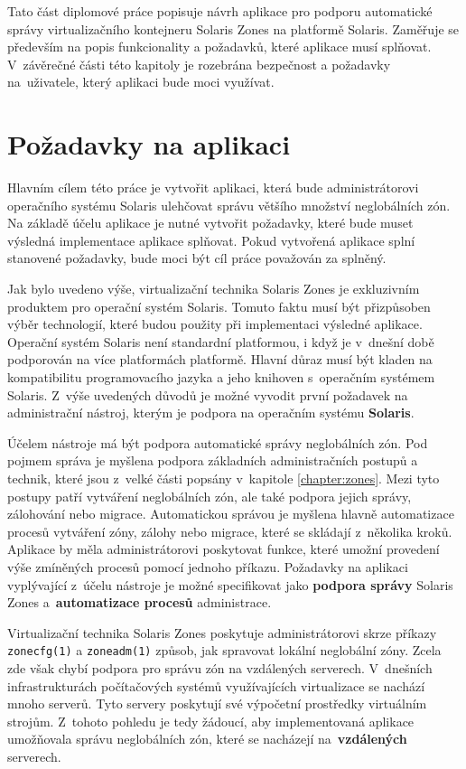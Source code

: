 Tato část diplomové práce popisuje návrh aplikace pro podporu automatické správy virtualizačního kontejneru Solaris Zones na
platformě Solaris. Zaměřuje se především na popis funkcionality a požadavků, které aplikace musí splňovat. V~závěrečné části
této kapitoly je rozebrána bezpečnost a požadavky na~uživatele, který aplikaci bude moci využívat.
\section{Požadavky na aplikaci}
\label{chapter:design:demands}
Hlavním cílem této práce je vytvořit aplikaci, která bude administrátorovi operačního systému Solaris ulehčovat správu
většího množství neglobálních zón. Na základě účelu aplikace je nutné vytvořit požadavky, které bude muset výsledná implementace
aplikace splňovat. Pokud vytvořená aplikace splní stanovené požadavky, bude moci být cíl práce považován za splněný.

Jak bylo uvedeno výše, virtualizační technika Solaris Zones je exkluzivním produktem pro operační
systém Solaris. Tomuto faktu musí být přizpůsoben výběr technologií, které budou použity při implementaci výsledné aplikace.
Operační systém Solaris není standardní platformou, i když je v~dnešní době podporován na více platformách platformě. Hlavní důraz
musí být kladen na kompatibilitu programovacího jazyka a jeho knihoven s~operačním systémem Solaris. Z~výše uvedených důvodů
je možné vyvodit první požadavek na administrační nástroj, kterým je podpora na operačním systému \textbf{Solaris}.

Účelem nástroje má být podpora automatické správy neglobálních zón. Pod pojmem správa je myšlena podpora základních administračních
postupů a technik, které jsou z~velké části popsány v~kapitole \ref{chapter:zones}. Mezi tyto postupy patří 
vytváření neglobálních zón, ale také podpora jejich správy, zálohování nebo migrace. Automatickou správou je myšlena hlavně
automatizace procesů vytváření zóny, zálohy nebo migrace, které se skládají z~několika kroků. Aplikace by měla administrátorovi
poskytovat funkce, které umožní provedení výše zmíněných procesů pomocí jednoho příkazu. Požadavky na aplikaci vyplývající
z~účelu nástroje je možné specifikovat jako \textbf{podpora správy} Solaris Zones a~\textbf{automatizace procesů} administrace.

Virtualizační technika Solaris Zones poskytuje administrátorovi skrze příkazy \verb|zonecfg(1)| a \verb|zoneadm(1)| způsob,
jak spravovat lokální neglobální zóny. Zcela zde však chybí podpora pro správu zón na vzdálených serverech. V~dnešních infrastrukturách
počítačových systémů využívajících virtualizace se nachází mnoho serverů. Tyto servery poskytují své výpočetní prostředky
virtuálním strojům. Z~tohoto pohledu je tedy žádoucí, aby implementovaná aplikace umožňovala správu neglobálních zón, které
se nacházejí na~\textbf{vzdálených} serverech.

